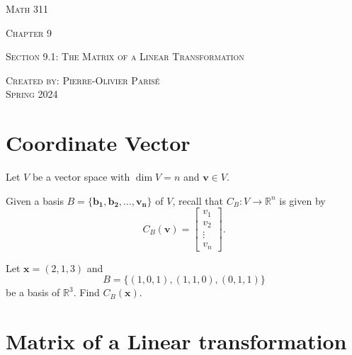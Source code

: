 \documentclass[20pt,a4paper]{extarticle}
\newcommand{\ra}{\rightarrow}
\newcounter{example}
\begin{document}
\thispagestyle{empty}

\begin{center}
\vspace*{0.75cm}

{\Huge \textsc{Math 311}}

\vspace*{1.5cm}

{\LARGE \textsc{Chapter 9}} 

\vspace*{0.75cm}

\noindent\textsc{Section 9.1: The Matrix of a Linear Transformation}

\vspace*{0.25cm}

\tableofcontents

\vfill

\noindent \textsc{Created by: Pierre-Olivier Paris{\'e}} \\
\textsc{Spring 2024}
\end{center}

\newpage

\section{Coordinate Vector}

	Let $V$ be a vector space with $\dim V = n$ and $\mathbf{v} \in V$. 

	Given a basis $B = \{ \mathbf{b_1} , \mathbf{b_2} , \ldots , \mathbf{v_n} \}$ of $V$, recall that $C_B : V \ra \mathbb{R}^n$ is given by
		\[
			C_B (\mathbf{v}) = \begin{bmatrix} v_1 \\ v_2 \\ \vdots \\ v_n \end{bmatrix} .
		\]

	\begin{example}
	Let $\mathbf{x} = (2, 1, 3)$ and 
		$$
			B = \{ (1, 0, 1) , (1, 1, 0) , (0, 1, 1) \} 
		$$
	be a basis of $\mathbb{R}^3$. Find $C_B (\mathbf{x})$.
	\end{example}

	\begin{solution}

	\end{solution}

	\newpage 

\section{Matrix of a Linear transformation}
\end{document}
